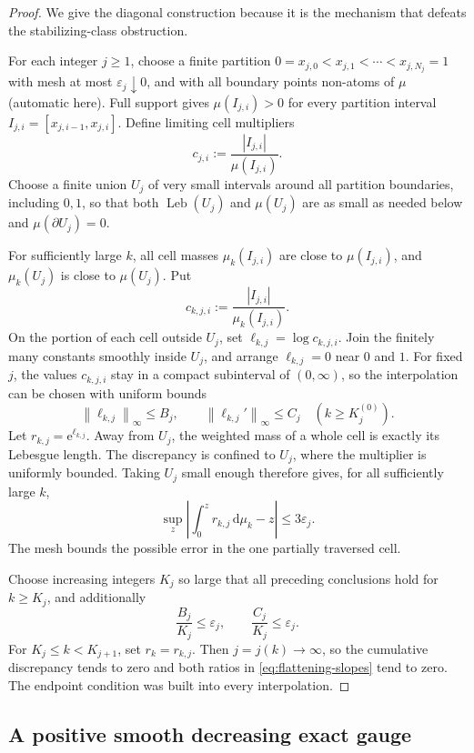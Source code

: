 \documentclass[11pt]{article}
\theoremstyle{definition}
\theoremstyle{remark}
\newcommand{\e}{\mathrm e}
\newcommand{\dd}{\,\mathrm d}
\newcommand{\Leb}{\operatorname{Leb}}
\newcommand{\norm}[1]{\left\lVert#1\right\rVert}
\begin{document}
\begin{proof}
We give the diagonal construction because it is the mechanism that defeats the
stabilizing-class obstruction.

For each integer \(j\ge1\), choose a finite partition
\(0=x_{j,0}<x_{j,1}<\cdots<x_{j,N_j}=1\) with mesh at most
\(\varepsilon_j\downarrow0\), and with all boundary points non-atoms of
\(\mu\) (automatic here).  Full support gives
\(\mu(I_{j,i})>0\) for every partition interval
\(I_{j,i}=[x_{j,i-1},x_{j,i}]\).  Define limiting cell multipliers
\[
 c_{j,i}:=\frac{|I_{j,i}|}{\mu(I_{j,i})}.
\]
Choose a finite union \(U_j\) of very small intervals around all partition
boundaries, including \(0,1\), so that both \(\Leb(U_j)\) and \(\mu(U_j)\)
are as small as needed below and \(\mu(\partial U_j)=0\).

For sufficiently large \(k\), all cell masses \(\mu_k(I_{j,i})\) are close
to \(\mu(I_{j,i})\), and \(\mu_k(U_j)\) is close to \(\mu(U_j)\).  Put
\[
 c_{k,j,i}:=\frac{|I_{j,i}|}{\mu_k(I_{j,i})}.
\]
On the portion of each cell outside \(U_j\), set
\(\ell_{k,j}=\log c_{k,j,i}\).  Join the finitely many constants smoothly
inside \(U_j\), and arrange \(\ell_{k,j}=0\) near \(0\) and \(1\).
For fixed \(j\), the values \(c_{k,j,i}\) stay in a compact subinterval of
\((0,\infty)\), so the interpolation can be chosen with uniform bounds
\[
 \norm{\ell_{k,j}}_\infty\le B_j,
 \qquad
 \norm{\ell_{k,j}'}_\infty\le C_j
 \quad(k\ge K_j^{(0)}).
\]
Let \(r_{k,j}=\e^{\ell_{k,j}}\).  Away from \(U_j\), the weighted mass of a
whole cell is exactly its Lebesgue length.  The discrepancy is confined to
\(U_j\), where the multiplier is uniformly bounded.  Taking \(U_j\) small
enough therefore gives, for all sufficiently large \(k\),
\[
 \sup_z\left|\int_0^zr_{k,j}\dd\mu_k-z\right|
 \le 3\varepsilon_j.
\]
The mesh bounds the possible error in the one partially traversed cell.

Choose increasing integers \(K_j\) so large that all preceding conclusions
hold for \(k\ge K_j\), and additionally
\[
 \frac{B_j}{K_j}\le\varepsilon_j,
 \qquad
 \frac{C_j}{K_j}\le\varepsilon_j.
\]
For \(K_j\le k<K_{j+1}\), set \(r_k=r_{k,j}\).  Then
\(j=j(k)\to\infty\), so the cumulative discrepancy tends to zero and both
ratios in \eqref{eq:flattening-slopes} tend to zero.  The endpoint condition
was built into every interpolation.
\end{proof}

\subsection{A positive smooth decreasing exact gauge}
\end{document}
